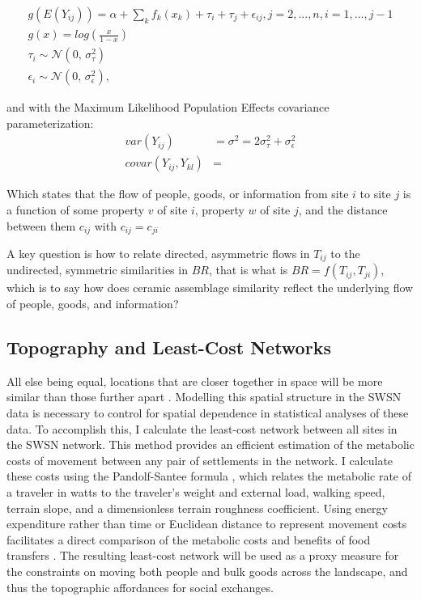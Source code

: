 \documentclass[fleqn,10pt]{wlscirep}
\begin{document}
\begin{equation}
\begin{split}
    g(E(Y_{ij})) = \alpha + \sum_k f_k(x_k) + \tau_i + \tau_j + \epsilon_{ij}, j = 2, ..., n, i = 1, ..., j - 1\\
    g(x) = log(\frac{x}{1-x})\\
    \tau_i \sim \mathcal{N}(0,\,\sigma^{2}_{\tau})\\
    \epsilon_i \sim \mathcal{N}(0,\,\sigma^{2}_{\epsilon}),
\end{split}
\end{equation}

and with the Maximum Likelihood Population Effects covariance parameterization:
\begin{gather}
    var(Y_{ij}) &= \sigma^2 = 2\sigma^{2}_{\tau} + \sigma^{2}_{\epsilon}\\
    covar(Y_{ij}, Y_{kl}) &=  
\end{gather}

Which states that the flow of people, goods, or information from site $i$ to site $j$ is a function of some property $v$ of site $i$, property $w$ of site $j$, and the distance between them $c_{ij}$ with $c_{ij} = c_{ji}$

A key question is how to relate directed, asymmetric flows in $T_{ij}$ to the undirected, symmetric similarities in $BR$, that is what is $BR = f(T_{ij},T_{ji})$, which is to say how does ceramic assemblage similarity reflect the underlying flow of people, goods, and information?

\subsection*{Topography and Least-Cost Networks}
All else being equal, locations that are closer together in space will be more similar than those further apart \cite{Tobler1970}. Modelling this spatial structure in the SWSN data is necessary to control for spatial dependence in statistical analyses of these data. To accomplish this, I calculate the least-cost network between all sites in the SWSN network. This method provides an efficient estimation of the metabolic costs of movement between any pair of settlements in the network. I calculate these costs using the Pandolf-Santee formula \cite{White2012}, which relates the metabolic rate of a traveler in watts to the traveler's weight and external load, walking speed, terrain slope, and a dimensionless terrain roughness coefficient. Using energy expenditure rather than time or Euclidean distance to represent movement costs facilitates a direct comparison of the metabolic costs and benefits of food transfers  \cite{Drennan1984}. The resulting least-cost network will be used as a proxy measure for the constraints on moving both people and bulk goods across the landscape, and thus the topographic affordances for social exchanges.
\end{document}
